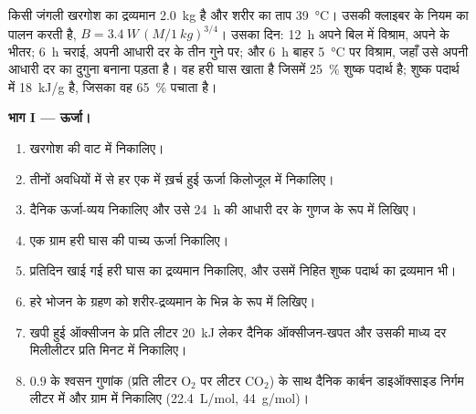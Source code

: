 \begin{problem}
\label{pb:b1:mammal-organization:1}
किसी जंगली खरगोश का द्रव्यमान \qty{2.0}{kg} है और शरीर का ताप
\qty{39}{\celsius}। उसकी  क्लाइबर के नियम का पालन करती
है, $B = \qty{3.4}{W}\,(M/\qty{1}{kg})^{3/4}$। उसका दिन: \qty{12}{h}
अपने बिल में विश्राम, अपने  के भीतर; \qty{6}{h} चराई,
अपनी आधारी दर के तीन गुने पर; और \qty{6}{h} बाहर \qty{5}{\celsius} पर
विश्राम, जहाँ उसे अपनी आधारी दर का दुगुना बनाना पड़ता है। वह हरी घास
खाता है जिसमें \qty{25}{\%} शुष्क पदार्थ है; शुष्क पदार्थ में
\qty{18}{kJ/g} है, जिसका वह \qty{65}{\%} पचाता है।

\medskip
\noindent\textbf{भाग I --- ऊर्जा।}
\begin{enumerate}
  \item खरगोश की  वाट में निकालिए।
  \item तीनों अवधियों में से हर एक में ख़र्च हुई ऊर्जा किलोजूल में
        निकालिए।
  \item दैनिक ऊर्जा-व्यय निकालिए और उसे \qty{24}{h} की आधारी दर के
        गुणज के रूप में लिखिए।
  \item एक ग्राम हरी घास की पाच्य ऊर्जा निकालिए।
  \item प्रतिदिन खाई गई हरी घास का द्रव्यमान निकालिए, और उसमें निहित
        शुष्क पदार्थ का द्रव्यमान भी।
  \item हरे भोजन के ग्रहण को शरीर-द्रव्यमान के भिन्न के रूप में लिखिए।
  \item खपी हुई ऑक्सीजन के प्रति लीटर \qty{20}{kJ} लेकर दैनिक
        ऑक्सीजन-खपत और उसकी माध्य दर मिलीलीटर प्रति मिनट में निकालिए।
  \item $0.9$ के श्वसन गुणांक (प्रति लीटर $\mathrm{O_2}$ पर लीटर
        $\mathrm{CO_2}$) के साथ दैनिक कार्बन डाइऑक्साइड निर्गम लीटर
        में और ग्राम में निकालिए (\qty{22.4}{L/mol},
        \qty{44}{g/mol})।
\end{enumerate}


\end{problem}
